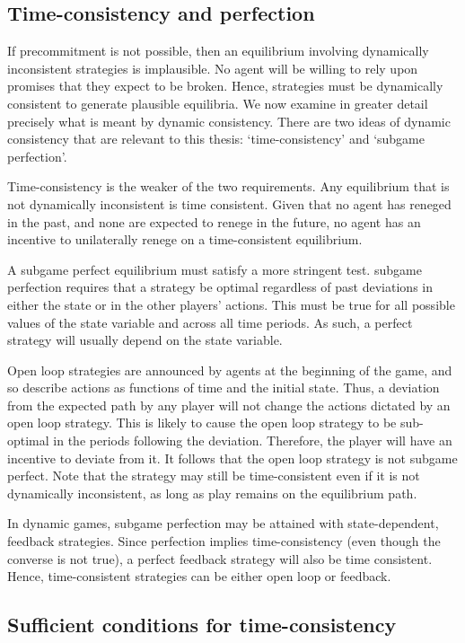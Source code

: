 \subsection{Time-consistency and perfection}

\label{sec:time-cons-perf} If precommitment is not possible, then an
equilibrium involving dynamically inconsistent strategies is implausible. No
agent will be willing to rely upon promises that they expect to be broken.
Hence, strategies must be dynamically consistent to generate plausible
equilibria. We now examine in greater detail precisely what is meant by
dynamic consistency. There are two ideas of dynamic consistency that are
relevant to this thesis: `time-consistency' and `subgame perfection'.

Time-consistency is the weaker of the two requirements. Any equilibrium that
is not dynamically inconsistent is time consistent. Given that no agent has
reneged in the past, and none are expected to renege in the future, no agent
has an incentive to unilaterally renege on a time-consistent equilibrium.

A subgame perfect equilibrium must satisfy a more stringent test. subgame
perfection requires that a strategy be optimal regardless of past deviations
in either the state or in the other players' actions. This must be true for
all possible values of the state variable and across all time periods. As
such, a perfect strategy will usually depend on the state variable.

Open loop strategies are announced by agents at the beginning of the game,
and so describe actions as functions of time and the initial state. Thus, a
deviation from the expected path by any player will not change the actions
dictated by an open loop strategy. This is likely to cause the open loop
strategy to be sub-optimal in the periods following the deviation.
Therefore, the player will have an incentive to deviate from it. It follows
that the open loop strategy is not subgame perfect. Note that the strategy
may still be time-consistent even if it is not dynamically inconsistent, as
long as play remains on the equilibrium path.

In dynamic games, subgame perfection may be attained with state-dependent,
feedback strategies. Since perfection implies time-consistency (even though
the converse is not true), a perfect feedback strategy will also be time
consistent. Hence, time-consistent strategies can be either open loop or
feedback.

\subsection{Sufficient conditions for time-consistency}

